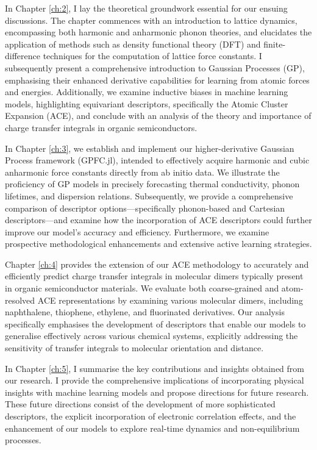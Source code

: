 In Chapter \ref{ch:2}, I lay the theoretical groundwork essential for our ensuing discussions.  The chapter commences with an introduction to lattice dynamics, encompassing both harmonic and anharmonic phonon theories, and elucidates the application of methods such as density functional theory (DFT) and finite-difference techniques for the computation of lattice force constants.  I subsequently present a comprehensive introduction to Gaussian Processes (GP), emphasising their enhanced derivative capabilities for learning from atomic forces and energies.  Additionally, we examine inductive biases in machine learning models, highlighting equivariant descriptors, specifically the Atomic Cluster Expansion (ACE), and conclude with an analysis of the theory and importance of charge transfer integrals in organic semiconductors.

 In Chapter \ref{ch:3}, we establish and implement our higher-derivative Gaussian Process framework (GPFC.jl), intended to effectively acquire harmonic and cubic anharmonic force constants directly from ab initio data. We illustrate the proficiency of GP models in precisely forecasting thermal conductivity, phonon lifetimes, and dispersion relations. Subsequently, we provide a comprehensive comparison of descriptor options—specifically phonon-based and Cartesian descriptors—and examine how the incorporation of ACE descriptors could further improve our model's accuracy and efficiency.  Furthermore, we examine prospective methodological enhancements and extensive active learning strategies.

Chapter \ref{ch:4} provides the extension of our ACE methodology to accurately and efficiently predict charge transfer integrals in molecular dimers typically present in organic semiconductor materials.  We evaluate both coarse-grained and atom-resolved ACE representations by examining various molecular dimers, including naphthalene, thiophene, ethylene, and fluorinated derivatives.  Our analysis specifically emphasises the development of descriptors that enable our models to generalise effectively across various chemical systems, explicitly addressing the sensitivity of transfer integrals to molecular orientation and distance.

In Chapter \ref{ch:5}, I summarise the key contributions and insights obtained from our research.  I provide the comprehensive implications of incorporating physical insights with machine learning models and propose directions for future research. These future directions consist of the development of more sophisticated descriptors, the explicit incorporation of electronic correlation effects, and the enhancement of our models to explore real-time dynamics and non-equilibrium processes.









